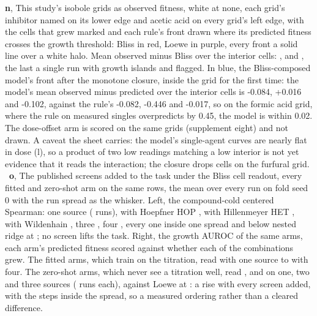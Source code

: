 \textbf{n}, This study's \hydnIsoboles{} isobole grids as observed fitness, white at
none, each grid's inhibitor named on its lower edge and acetic acid on every grid's
left edge, with the cells that grew marked and each rule's front drawn where its
predicted fitness crosses the growth threshold: Bliss in red, Loewe in purple, every
front a solid line over a white halo. Mean observed minus Bliss over the
\hydisoboleExTwoSixCells{} interior cells: \hydisoboleExTwoSixExcess{},
\hydisoboleExTwoSevenExcess{} and \hydisoboleExTwoEightExcess{}, the last a single run
with growth islands and flagged. In blue, the Bliss-composed model's front after the
monotone closure, inside the grid for the first time: the model's mean observed minus
predicted over the interior cells is -0.084, +0.016 and -0.102, against the rule's
-0.082, -0.446 and -0.017, so on the formic acid grid, where the rule on measured
singles overpredicts by 0.45, the model is within 0.02. The dose-offset arm is scored on
the same grids (supplement eight) and not drawn. A caveat the sheet carries: the
model's single-agent curves are nearly flat in dose (l), so a product of two low
readings matching a low interior is not yet evidence that it reads the interaction; the
closure drops \hydisoboleExTwoSixModelIslands{} cells on the furfural grid.
\,
\textbf{o}, The published screens added to the task under the Bliss cell readout, every
fitted and zero-shot arm on the same rows, the mean over every run on fold seed 0 with
the run spread as the whisker. Left, the compound-cold centered Spearman: one source
\hydrOneZeroonegenemean{} (\hydrOneZeroonegenen{} runs), with Hoepfner HOP
\hydrOneZerohopgenemean{}, with Hillenmeyer HET \hydrOneZerohetgenemean{}, with
Wildenhain \hydrOneZerowilgenemean{}, three \hydrOneZerothreegenemean{}, four
\hydrOneZerofourgenemean{}, every one inside one spread and below nested ridge at
\hydladderRidge{}; no screen lifts the task. Right, the growth AUROC of the same arms,
each arm's predicted fitness scored against whether each of the \hydnCombinations{}
combinations grew. The fitted arms, which train on the
titration, read \hydrOneZeroonegrowthmean{} with one source to
\hydrOneZerofourgrowthmean{} with four. The zero-shot arms, which never see a titration
well, read \hydrOneZerozsOnegrowthmean{}, \hydrOneZerozsTwogrowthmean{} and
\hydrOneZerozsThreegrowthmean{} on one, two and three sources
(\hydrOneZerozsOnegrowthn{} runs each), against Loewe at \hydloeweAuroc{}: a rise with
every screen added, with the steps inside the spread, so a measured ordering rather
than a cleared difference. \,

